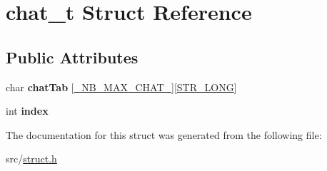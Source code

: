 \hypertarget{structchat__t}{}\section{chat\+\_\+t Struct Reference}
\label{structchat__t}
\subsection*{Public Attributes}
\begin{DoxyCompactItemize}
\item 
\mbox{\label{structchat__t_a201bdb2013f71d7400a2a9eb17435b41}} 
char {\bfseries chat\+Tab} \mbox{[}\hyperlink{common_8h_ac6bd696307d6341dd5d9f6b16d250341}{\+\_\+\+N\+B\+\_\+\+M\+A\+X\+\_\+\+C\+H\+A\+T\+\_\+}\mbox{]}\mbox{[}\hyperlink{common_8h_a44318a4127425708d1a624818539430f}{S\+T\+R\+\_\+\+L\+O\+NG}\mbox{]}
\item 
\mbox{\label{structchat__t_a429072f9662cd272093927087b546309}} 
int {\bfseries index}
\end{DoxyCompactItemize}


The documentation for this struct was generated from the following file\+:\begin{DoxyCompactItemize}
\item 
src/\hyperlink{struct_8h}{struct.\+h}\end{DoxyCompactItemize}
